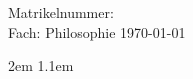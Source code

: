 \ifdefined\layoutanon
\begin{center}
\noindent\begin{minipage}{0.8\linewidth}
\begin{center}
\emph{\art}
\vskip 1.6cm
{%
    \Large\onehalfspacing
    \titel \par}
\vskip 3.5cm
Matrikelnummer: \matrikelnummer \\
Fach: Philosophie
\vskip 1.5cm
\today
\end{center}
\end{minipage}
\end{center}
\vfill
\fi

\ifdefined\layouttoc
{\singlespacing \tableofcontents}
\pagebreak
\fi

\ifdefined\layoutletter
\else
  \parindent 0pt
  \parskip 12pt
\fi

\ifdefined\layoutindent
  \ifdefined\layoutdoublespacing
    \parindent 2em
  \else
    \parindent 1.1em
  \fi
  \parskip 0pt
\fi

\ifdefined\layoutonehalfspacing
  \onehalfspacing
\fi

\ifdefined\layoutdoublespacing
  \doublespacing
\fi


